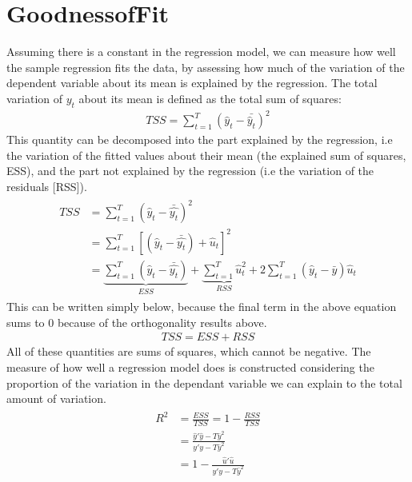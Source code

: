 \documentclass[letterpaper,10pt,english]{jupyterBook}
\begin{document}
\section{Goodness\sphinxhyphen{}of\sphinxhyphen{}Fit}
\label{\detokenize{parts/econometric-theory/linearmodels:goodness-of-fit}}
Assuming there is a constant in the regression model, we can measure how
well the sample regression fits the data, by assessing how much of the
variation of the dependent variable about its mean is explained by the
regression. The total variation of \(y_t\) about its mean is defined as
the total sum of squares:
\begin{equation*}
\begin{split}TSS = \sum_{t=1}^T (\hat y_t - \bar{\hat y_t})^2\end{split}
\end{equation*}
This quantity can be decomposed into the part explained by the
regression, i.e the variation of the fitted values about their mean (the
explained sum of squares, ESS), and the part not explained by the
regression (i.e the variation of the residuals {[}RSS{]}).
\begin{equation*}
\begin{split}\begin{aligned}
      TSS &=  \sum_{t=1}^T (\hat y_t - \bar{\hat{y_t}})^2 \\ 
      &= \sum_{t=1}^T [(\hat y_t - \bar{\hat{y_t}}) + \hat u_t]^2 \\
      &= \underbrace{\sum_{t=1}^T (\hat y_t - \bar{\hat{y_t}})}_{ESS} + \underbrace{\sum_{t=1}^T \hat u_t^2}_{RSS} + 2\sum_{t=1}^T (\hat y_t - \bar y) \hat u_t
\end{aligned}\end{split}
\end{equation*}
This can be written simply below, because the final term in the above
equation sums to 0 because of the orthogonality results above.
\begin{equation*}
\begin{split}TSS = ESS + RSS\end{split}
\end{equation*}
All of these quantities are sums of squares, which cannot be negative.
The measure of how well a regression model does is constructed
considering the proportion of the variation in the dependant variable we
can explain to the total amount of variation.
\begin{equation*}
\begin{split}\begin{aligned}
    R^2 &= \frac{ESS}{TSS} = 1- \frac{RSS}{TSS} \\
    &= \frac{ \hat y' \hat y - T \bar y ^2 } {y' y - T \bar y ^2} \\
    &= 1 - \frac{\hat u' \hat u} {y'y - T \bar y ^2}
\end{aligned}\end{split}
\end{equation*}
\end{document}
